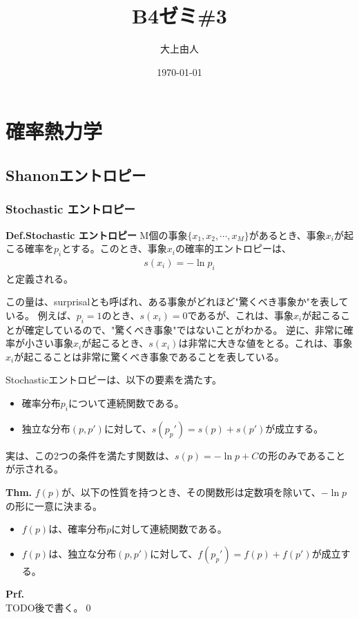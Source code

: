 \documentclass[a4paper,11pt]{jsarticle}
\numberwithin{equation}{section}
\begin{document}
\title{B4ゼミ\#3}
\author{大上由人}
\date{\today}
\maketitle

\setcounter{section}{2}
\section{確率熱力学}
\subsection{Shanonエントロピー}
\subsubsection{Stochastic エントロピー}
\begin{itembox}[l]{\textbf{Def.Stochastic エントロピー}}
    M個の事象$\{x_1, x_2, \cdots, x_M\}$があるとき、事象$x_i$が起こる確率を$p_i$とする。このとき、事象$x_i$の確率的エントロピーは、
    \begin{align}
        s(x_i) = -\ln p_i
    \end{align}
    と定義される。
\end{itembox}
この量は、surprisalとも呼ばれ、ある事象がどれほど"驚くべき事象か"を表している。
例えば、$p_i = 1$のとき、$s(x_i) = 0$であるが、これは、事象$x_i$が起こることが確定しているので、"驚くべき事象"ではないことがわかる。
逆に、非常に確率が小さい事象$x_i$が起こるとき、$s(x_i)$は非常に大きな値をとる。これは、事象$x_i$が起こることは非常に驚くべき事象であることを表している。

Stochasticエントロピーは、以下の要素を満たす。
\begin{itemize}
    \item 確率分布$p_i$について連続関数である。
    \item 独立な分布$(p,p')$に対して、$s(p_p') = s(p) + s(p')$が成立する。
\end{itemize}
実は、この2つの条件を満たす関数は、$s(p) = -\ln p + C$の形のみであることが示される。

\begin{itembox}[l]{\textbf{Thm.}}
    $f(p)$が、以下の性質を持つとき、その関数形は定数項を除いて、$-\ln p$の形に一意に決まる。
    \begin{itemize}
        \item $f(p)$は、確率分布$p$に対して連続関数である。
        \item $f(p)$は、独立な分布$(p,p')$に対して、$f(p_p') = f(p) + f(p')$が成立する。
    \end{itemize}
\end{itembox}
\textbf{Prf.}\\
\indent
TODO後で書く。\qed\\
\end{document}
